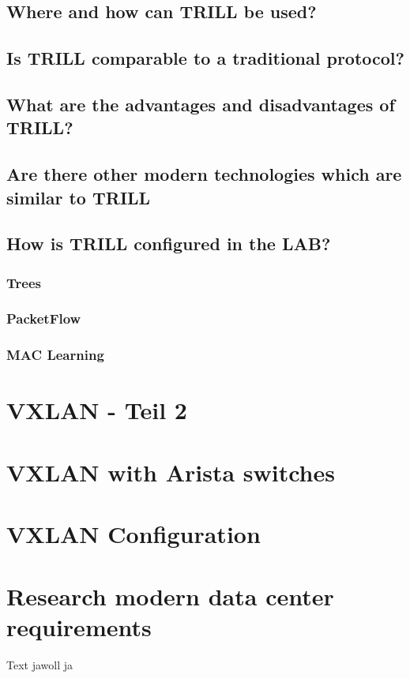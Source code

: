 \documentclass[a4,12pt]{scrartcl}
\begin{document}
\subsection{Where and how can TRILL be used?}
\subsection{Is TRILL comparable to a traditional protocol?}
\subsection{What are the advantages and disadvantages of TRILL?}
\subsection{Are there other modern technologies which are similar to TRILL}
\subsection{How is TRILL configured in the LAB?}
\subsubsection{Trees}
\subsubsection{PacketFlow}
\subsubsection{MAC Learning} 
\newpage
\section{VXLAN - Teil 2}
\section{VXLAN with Arista switches}
\section{VXLAN Configuration}
\section{Research modern data center requirements}
Text jawoll ja
\end{document}
